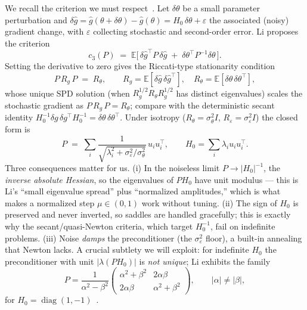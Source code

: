 \documentclass[11pt]{article}
\theoremstyle{plain}
\theoremstyle{definition}
\theoremstyle{remark}
\DeclareMathOperator{\diag}{diag}
\newcommand{\E}{\mathbb{E}}
\begin{document}
We recall the criterion we must respect~\cite{li2015}. Let $\delta\theta$ be a small
parameter perturbation and $\delta\hat g=\hat g(\theta+\delta\theta)-\hat g(\theta)
=H_0\,\delta\theta+\varepsilon$ the associated (noisy) gradient change, with $\varepsilon$
collecting stochastic and second-order error. Li proposes the criterion
\begin{equation}
\label{eq:c3}
  c_3(P) \;=\; \E\!\big[\,\delta\hat g^{\!\top}P\,\delta\hat g
                     \;+\; \delta\theta^{\!\top}P^{-1}\delta\theta\,\big].
\end{equation}
Setting the derivative to zero gives the Riccati-type stationarity condition
\begin{equation}
\label{eq:riccati}
  P\,R_g\,P \;=\; R_\theta,
  \qquad R_g=\E[\delta\hat g\,\delta\hat g^{\!\top}],\quad
         R_\theta=\E[\delta\theta\,\delta\theta^{\!\top}],
\end{equation}
whose unique SPD solution (when $R_g^{1/2}R_\theta R_g^{1/2}$ has distinct eigenvalues)
scales the stochastic gradient as $P\,R_g\,P=R_\theta$; compare with the deterministic
secant identity $H_0^{-1}\delta g\,\delta g^{\!\top}H_0^{-1}=\delta\theta\,\delta\theta^{\!\top}$.
Under isotropy ($R_\theta=\sigma_\theta^2 I$, $R_\varepsilon=\sigma_\varepsilon^2 I$) the
closed form is
\begin{equation}
\label{eq:li-closed}
  P \;=\; \sum_i \frac{1}{\sqrt{\lambda_i^2+\sigma_\varepsilon^2/\sigma_\theta^2}}\,u_iu_i^{\!\top},
  \qquad H_0=\sum_i\lambda_i u_iu_i^{\!\top}.
\end{equation}
Three consequences matter for us. (i) In the noiseless limit $P\to|H_0|^{-1}$, the
\emph{inverse absolute Hessian}, so the eigenvalues of $PH_0$ have unit modulus --- this is
Li's ``small eigenvalue spread'' plus ``normalized amplitudes,'' which is what makes a
normalized step $\mu\in(0,1)$ work without tuning. (ii) The sign of $H_0$ is preserved and
never inverted, so saddles are handled gracefully; this is exactly why the secant/quasi-Newton
criteria, which target $H_0^{-1}$, fail on indefinite problems. (iii) Noise \emph{damps} the
preconditioner (the $\sigma_\varepsilon^2$ floor), a built-in annealing that Newton lacks.
A crucial subtlety we will exploit: for indefinite $H_0$ the preconditioner with unit
$|\lambda(PH_0)|$ is \emph{not unique}; Li exhibits the family
\begin{equation}
\label{eq:li-hyperbolic}
  P=\frac{1}{\alpha^2-\beta^2}
     \begin{pmatrix} \alpha^2+\beta^2 & 2\alpha\beta\\[2pt] 2\alpha\beta & \alpha^2+\beta^2\end{pmatrix},
  \qquad |\alpha|\neq|\beta|,
\end{equation}
for $H_0=\diag(1,-1)$~\cite{li2015}.
\end{document}
